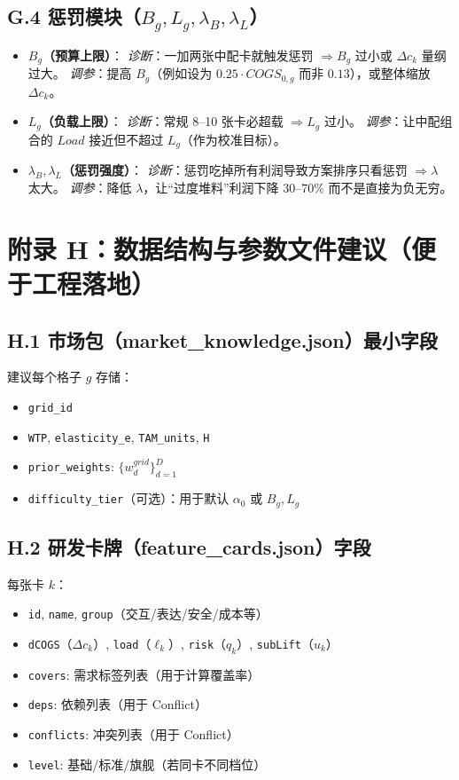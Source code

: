 \documentclass[UTF8,12pt]{ctexart}
\begin{document}
\subsection{G.4 惩罚模块（$B_g,L_g,\lambda_B,\lambda_L$）}
\begin{itemize}
\item \textbf{$B_g$（预算上限）}：
\emph{诊断}：一加两张中配卡就触发惩罚 $\Rightarrow B_g$ 过小或 $\Delta c_k$ 量纲过大。
\emph{调参}：提高 $B_g$（例如设为 $0.25\cdot COGS_{0,g}$ 而非 $0.13$），或整体缩放 $\Delta c_k$。
\item \textbf{$L_g$（负载上限）}：
\emph{诊断}：常规 8--10 张卡必超载 $\Rightarrow L_g$ 过小。
\emph{调参}：让中配组合的 $Load$ 接近但不超过 $L_g$（作为校准目标）。
\item \textbf{$\lambda_B,\lambda_L$（惩罚强度）}：
\emph{诊断}：惩罚吃掉所有利润导致方案排序只看惩罚 $\Rightarrow \lambda$ 太大。
\emph{调参}：降低 $\lambda$，让“过度堆料”利润下降 30--70\% 而不是直接为负无穷。
\end{itemize}

\clearpage
\section{附录 H：数据结构与参数文件建议（便于工程落地）}

\subsection{H.1 市场包（market\_knowledge.json）最小字段}
建议每个格子 $g$ 存储：
\begin{itemize}
  \item \texttt{grid\_id}
  \item \texttt{WTP}, \texttt{elasticity\_e}, \texttt{TAM\_units}, \texttt{H}
  \item \texttt{prior\_weights}: $\{w^{grid}_d\}_{d=1}^D$
  \item \texttt{difficulty\_tier}（可选）：用于默认 $\alpha_0$ 或 $B_g,L_g$
\end{itemize}

\subsection{H.2 研发卡牌（feature\_cards.json）字段}
每张卡 $k$：
\begin{itemize}
  \item \texttt{id}, \texttt{name}, \texttt{group}（交互/表达/安全/成本等）
  \item \texttt{dCOGS}（$\Delta c_k$）, \texttt{load}（$\ell_k$）, \texttt{risk}（$q_k$）, \texttt{subLift}（$u_k$）
  \item \texttt{covers}: 需求标签列表（用于计算覆盖率）
  \item \texttt{deps}: 依赖列表（用于 Conflict）
  \item \texttt{conflicts}: 冲突列表（用于 Conflict）
  \item \texttt{level}: 基础/标准/旗舰（若同卡不同档位）
\end{itemize}
\end{document}
